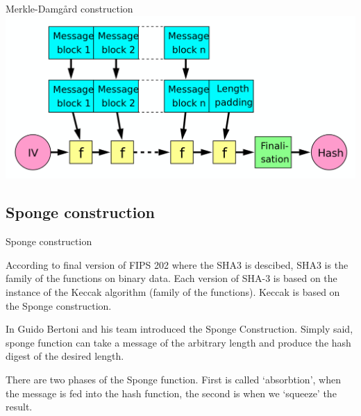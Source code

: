 \documentclass{beamer}
\begin{document}
\begin{frame}{Merkle-Damgård construction}
    \includegraphics[width=\textwidth]{Merkle-Damgard_hash_big.svg.png}
\end{frame}

\subsection{Sponge construction}

\begin{frame}{Sponge construction}
    \par According to final version of FIPS 202 where the SHA3 is descibed, 
    SHA3 is the family of the functions on binary data. Each version of SHA-3 
    is based on the instance of the Keccak algorithm (family of the functions).
    Keccak is based on the Sponge construction. 
    \newline \newline
    \pause
    \par In Guido Bertoni and his team introduced the Sponge Construction. Simply 
    said, sponge function can take a message of the arbitrary length and 
    produce the hash digest of the desired length.
    \newline \newline
    \pause
    \par There are two phases of the Sponge function. First is called `absorbtion', 
    when the message is fed into the hash function, the second is when we 
    `squeeze' the result.
\end{frame}
\end{document}

